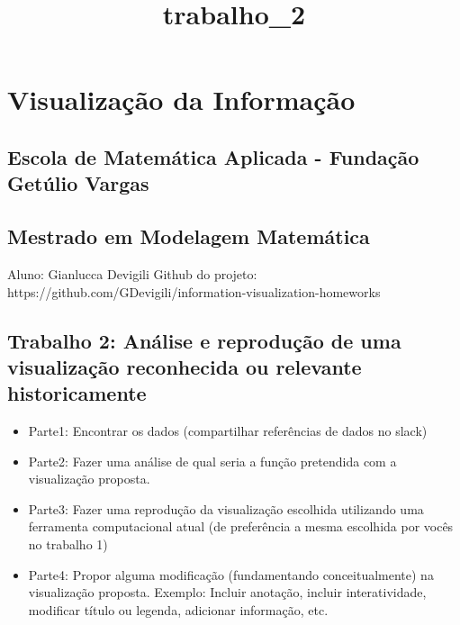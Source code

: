 \documentclass[11pt]{article}
\title{trabalho\_2}
\providecommand{\tightlist}{%
      \setlength{\itemsep}{0pt}\setlength{\parskip}{0pt}}
\begin{document}
    
    \maketitle
    
    

    
    \hypertarget{visualizauxe7uxe3o-da-informauxe7uxe3o}{%
\section{Visualização da
Informação}\label{visualizauxe7uxe3o-da-informauxe7uxe3o}}

\hypertarget{escola-de-matemuxe1tica-aplicada---fundauxe7uxe3o-getuxfalio-vargas}{%
\subsection{Escola de Matemática Aplicada - Fundação Getúlio
Vargas}\label{escola-de-matemuxe1tica-aplicada---fundauxe7uxe3o-getuxfalio-vargas}}

\hypertarget{mestrado-em-modelagem-matemuxe1tica}{%
\subsection{Mestrado em Modelagem
Matemática}\label{mestrado-em-modelagem-matemuxe1tica}}

Aluno: Gianlucca Devigili Github do projeto:
https://github.com/GDevigili/information-visualization-homeworks

\hypertarget{trabalho-2-anuxe1lise-e-reproduuxe7uxe3o-de-uma-visualizauxe7uxe3o-reconhecida-ou-relevante-historicamente}{%
\subsection{Trabalho 2: Análise e reprodução de uma visualização
reconhecida ou relevante
historicamente}\label{trabalho-2-anuxe1lise-e-reproduuxe7uxe3o-de-uma-visualizauxe7uxe3o-reconhecida-ou-relevante-historicamente}}

\begin{itemize}
\tightlist
\item
  Parte1: Encontrar os dados (compartilhar referências de dados no
  slack)
\item
  Parte2: Fazer uma análise de qual seria a função pretendida com a
  visualização proposta.
\item
  Parte3: Fazer uma reprodução da visualização escolhida utilizando uma
  ferramenta computacional atual (de preferência a mesma escolhida por
  vocês no trabalho 1)
\item
  Parte4: Propor alguma modificação (fundamentando conceitualmente) na
  visualização proposta. Exemplo: Incluir anotação, incluir
  interatividade, modificar título ou legenda, adicionar informação,
  etc.
\end{itemize}
\end{document}
